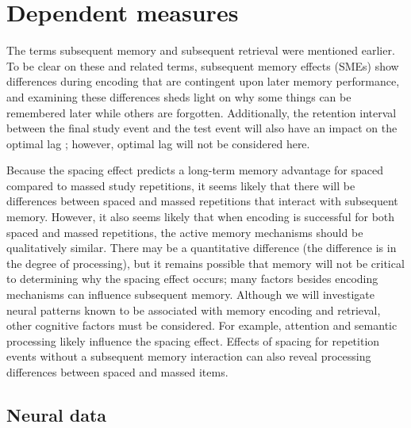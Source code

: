
\chapter{Dependent measures}

The terms subsequent memory and subsequent retrieval were mentioned earlier.  To be clear on these and related terms, subsequent memory effects (SMEs) show differences during encoding that are contingent upon later memory performance, and examining these differences sheds light on why some things can be remembered later while others are forgotten.  Additionally, the retention interval between the final study event and the test event will also have an impact on the optimal lag \cite{CepeEtal2006,Glen1976,Glen1977,Glen1979}; however, optimal lag will not be considered here.

Because the spacing effect predicts a long-term memory advantage for spaced compared to massed study repetitions, it seems likely that there will be differences between spaced and massed repetitions that interact with subsequent memory.  However, it also seems likely that when encoding is successful for both spaced and massed repetitions, the active memory mechanisms should be qualitatively similar.  There may be a quantitative difference (the difference is in the degree of processing), but it remains possible that memory will not be critical to determining why the spacing effect occurs; many factors besides encoding mechanisms can influence subsequent memory.  Although we will investigate neural patterns known to be associated with memory encoding and retrieval, other cognitive factors must be considered.  For example, attention and semantic processing likely influence the spacing effect.  Effects of spacing for repetition events without a subsequent memory interaction can also reveal processing differences between spaced and massed items.


\section{Neural data}


